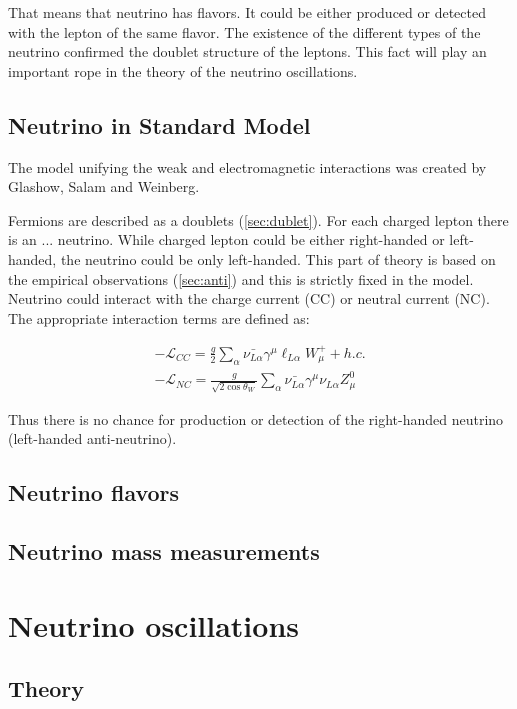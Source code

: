 \documentclass[../main.tex]{subfiles}
\begin{document}
That means that neutrino has flavors. It could be either produced or detected with the lepton of the same flavor. The existence of the different types of the neutrino confirmed the doublet structure of the leptons. This fact will play an important rope in the theory of the neutrino oscillations.


\subsection{Neutrino in Standard Model}
\label{sec:sm}

The model unifying the weak and electromagnetic interactions was created by Glashow, Salam and Weinberg.

Fermions are described as a doublets (\autoref{sec:dublet}). For each charged lepton there is an ... neutrino. While charged lepton could be either right-handed or left-handed, the neutrino could be only left-handed. This part of theory is based on the empirical observations (\autoref{sec:anti}) and this is strictly fixed in the model. Neutrino could interact with the charge current (CC) or neutral current (NC). The appropriate interaction terms are defined as:

\begin{eqnarray}
-\mathcal{L}_{CC}=\frac{g}{2}\sum_\alpha\bar{\nu_{L\alpha}}\gamma^\mu\ell_{L\alpha}W^+_\mu+h.c. \\ \nonumber
-\mathcal{L}_{NC}=\frac{g}{\sqrt{2\cos{\theta_W}}}\sum_\alpha\bar{\nu_{L\alpha}}\gamma^\mu\nu_{L\alpha}Z^0_\mu
\end{eqnarray}

Thus there is no chance for production or detection of the right-handed neutrino (left-handed anti-neutrino).

\subsection{Neutrino flavors}

\subsection{Neutrino mass measurements}


\section{Neutrino oscillations}
\label{sec:osc}

\subsection{Theory}
\end{document}
